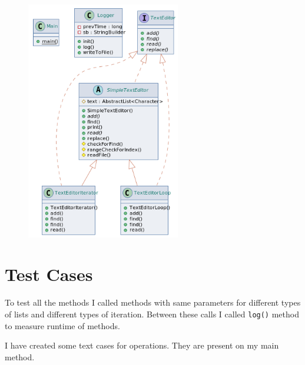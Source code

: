 \documentclass[a4paper]{article}
\begin{document}
\begin{large}
\begin{figure}[htp]
  \centering
  \includegraphics[width=0.6\textwidth]{class-diagram-2}
\end{figure}

\newpage

\section{Test Cases}

To test all the methods I called methods with same parameters for different types of lists and different types of iteration. Between these calls I called \texttt{log()} method to measure runtime of methods. 
\vspace{1em}

I have created some text cases for operations. They are present on my main method.


\begin{center}

  \begin{table}[htp]
    

\end{table}
\end{center}
\end{large}
\end{document}
